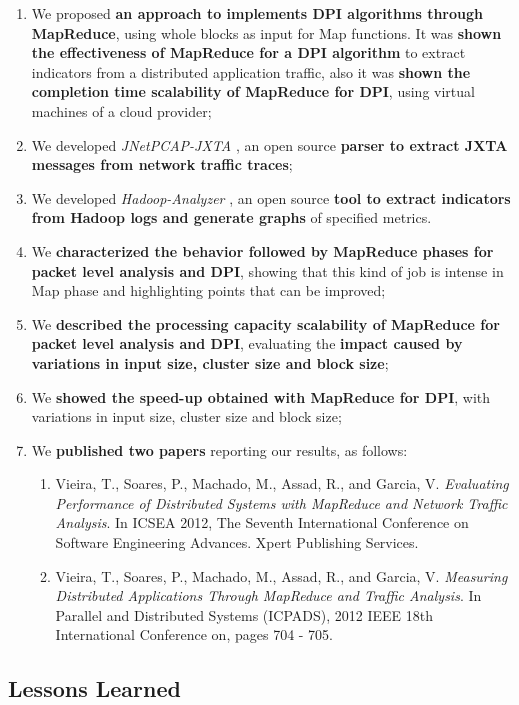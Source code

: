 \begin{enumerate}
	\item We proposed \textbf{an approach to implements DPI algorithms through MapReduce}, using whole blocks as input for Map functions. It was \textbf{shown the effectiveness of MapReduce for a DPI algorithm} to extract indicators from a distributed application traffic, also it was \textbf{shown the completion time scalability of MapReduce for DPI}, using virtual machines of a cloud provider;
	\item We developed \textit{JNetPCAP-JXTA} \citep{jnetpcapjxta}, an open source \textbf{parser to extract JXTA messages from network traffic traces};
	\item We developed \textit{Hadoop-Analyzer} \citep{Hadoopanalyzer}, an open source \textbf{tool to extract indicators from Hadoop logs and generate graphs} of specified metrics.
	\item We \textbf{characterized the behavior followed by MapReduce phases for packet level analysis and DPI}, showing that this kind of job is intense in Map phase and highlighting points that can be improved;
	\item We \textbf{described the processing capacity scalability of MapReduce for packet level analysis and DPI}, evaluating the \textbf{impact caused by variations in input size, cluster size and block size};
	\item We \textbf{showed the speed-up obtained with MapReduce for DPI}, with variations in input size, cluster size and block size;
	\item We \textbf{published two papers} reporting our results, as follows:
	\begin{enumerate}
		\item Vieira, T., Soares, P., Machado, M., Assad, R., and Garcia, V. \textit{Evaluating Performance of Distributed Systems with MapReduce and Network Traffic Analysis}. In ICSEA 2012, The Seventh International Conference on Software Engineering Advances. Xpert Publishing Services.
		\item Vieira, T., Soares, P., Machado, M., Assad, R., and Garcia, V. \textit{Measuring Distributed Applications Through MapReduce and Traffic Analysis}. In Parallel and Distributed Systems (ICPADS), 2012 IEEE 18th International Conference on, pages 704 - 705.	
	\end{enumerate}
\end{enumerate}

\subsection{Lessons Learned}
\label{sc:chaptersummary}

